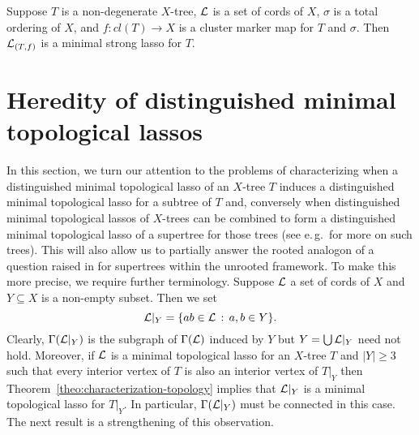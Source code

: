 \begin{cor}\label{corollary:strong-lasso-characterization}
Suppose $T$ is a non-degenerate $X$-tree, 
${\mathcal L}$ is a set of cords of $X$, $\sigma$
is a total ordering  of $X$, and  $f:cl(T)\to X$
is a cluster marker map for $T$ and $\sigma$. 
Then ${\mathcal L}_{(T,f)}$ is a minimal strong lasso for $T$.
\end{cor}


\section{Heredity of distinguished minimal 
topological lassos}\label{sec:subtree}

In this section, we turn our attention to the problems of characterizing when
a distinguished minimal topological lasso of an $X$-tree $T$ induces
a distinguished minimal topological lasso for a subtree of $T$ and, conversely
when distinguished minimal topological lassos of $X$-trees can be
combined to form a distinguished minimal topological lasso of a supertree
for those trees (see e.\,g.\,\cite{BE00} for more on such trees). This 
will also allow us to partially answer the rooted analogon of
a question raised in \cite{DHS11} for supertrees within the unrooted framework.
To make this more precise, we require further terminology.
Suppose ${\mathcal L}$ a set of cords of $X$ and $Y\subseteq X$ is a 
non-empty subset. Then we set 
$$
{\mathcal L}|_Y=\{ab\in{\mathcal L}\,:\, a,b\in Y\}.
$$
Clearly, $\Gamma({\mathcal L}|_Y)$ is the
subgraph of $\Gamma({\mathcal L})$ induced by $Y$ but
 $Y=\bigcup {\mathcal L}|_Y$ need not hold. Moreover, if 
 ${\mathcal L}$ is a minimal topological lasso for 
an $X$-tree $T$ and $|Y|\geq 3$ such that every interior vertex
of $T$ is also an interior vertex of $T|_Y$ then
 Theorem~\ref{theo:characterization-topology} implies that
${\mathcal L}|_Y$ is a minimal topological lasso for $T|_Y$. In particular, 
$\Gamma({\mathcal L}|_Y)$ must be connected in this case. 
The next result is a strengthening
of this observation. 

